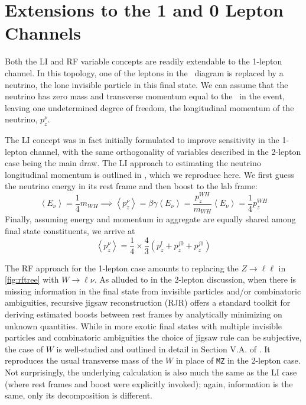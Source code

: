 \section{Extensions to the 1 and 0 Lepton Channels}
\label{sec:rfli01lep}
Both the LI and RF variable concepts are readily extendable to the 1-lepton channel.  In this topology, one of the leptons in the \ZH\, diagram is replaced by a neutrino, the lone invisible particle in this final state.  We can assume that the neutrino has zero mass and transverse momentum equal to the \met\, in the event, leaving one undetermined degree of freedom, the longitudinal momentum of the neutrino, $p_z^{\nu}$.  

The LI concept was in fact initially formulated to improve sensitivity in the 1-lepton channel, with the same orthogonality of variables described in the 2-lepton case being the main draw.  The LI approach to estimating the neutrino longitudinal momentum is outlined in \cite{litalk}, which we reproduce here.  We first guess the neutrino energy in its rest frame and then boost to the lab frame:
\begin{equation}
\left<E_\nu\right>=\frac{1}{4}m_{WH}\implies \left<p_z^{\nu}\right>=\beta\gamma\left<E_\nu\right>=\frac{p_z^{WH}}{m_{WH}}\left<E_\nu\right>=\frac{1}{4}p_z^{WH}
\end{equation}
Finally, assuming energy and momentum in aggregate are equally shared among final state constituents, we arrive at
\begin{equation}
\label{eqn:lipz}
\left<p_z^{\nu}\right>=\frac{1}{4}\times \frac{4}{3}\left(p_z^l+p_z^{j0}+p_z^{j1}\right)
\end{equation}

The RF approach for the 1-lepton case amounts to replacing the $Z\to\ell\ell$ in \ref{fig:rftree} with $W\to\ell\nu$.  As alluded to in the 2-lepton discussion, when there is missing information in the final state from invisible particles and/or combinatoric ambiguities, recursive jigsaw reconstruction (RJR) offers a standard toolkit for deriving estimated boosts between rest frames by analytically minimizing on unknown quantities.  While in more exotic final states with multiple invisible particles and combinatoric ambiguities the choice of jigsaw rule can be subjective, the case of $W$ is well-studied and outlined in detail in Section V.A. of \cite{rjr}.  It reproduces the usual transverse mass of the $W$ in place of \texttt{MZ} in the 2-lepton case.  Not surprisingly, the underlying calculation is also much the same as the LI case (where rest frames and boost were explicitly invoked); again, information is the same, only its decomposition is different.

